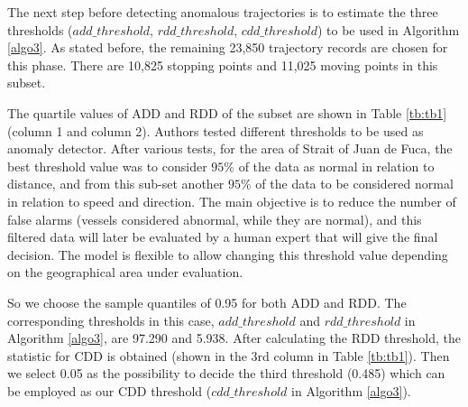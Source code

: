 \documentclass[12pt,glossary]{dalcsthesis}
\begin{document}
The next step before detecting anomalous trajectories is to estimate the three thresholds ($add\_threshold$, $rdd\_threshold$, $cdd\_threshold$) to be used in Algorithm \ref{algo3}. As stated before, the remaining 23,850 trajectory records  are chosen for this phase. There are 10,825 stopping points and 11,025 moving points in this subset.

The quartile values of ADD and RDD of the subset are shown in Table \ref{tb:tb1} (column 1 and column 2).
Authors tested different thresholds to be used as anomaly detector. After various tests, for the area of Strait of Juan de Fuca, the best threshold value was to consider $95\%$ of the data as normal in relation to distance, and from this sub-set another $95\%$ of the data to be considered normal in relation to speed and direction. The main objective is to reduce the number of false alarms (vessels considered abnormal, while they are normal), and this filtered data will later be evaluated by a human expert that will give the final decision. The model is flexible to allow changing this threshold value depending on the geographical area under evaluation.

 So we choose the sample quantiles of 0.95 for both ADD and RDD. The corresponding thresholds in this case, $add\_threshold$ and $rdd\_threshold$ in Algorithm \ref{algo3}, are 97.290 and 5.938. After calculating the RDD threshold, the statistic for CDD is obtained (shown in the 3rd column in Table \ref{tb:tb1}). Then we select 0.05 as the possibility to decide the third threshold (0.485) which can be employed as our CDD threshold ($cdd\_threshold$ in Algorithm \ref{algo3}). 
\end{document}
